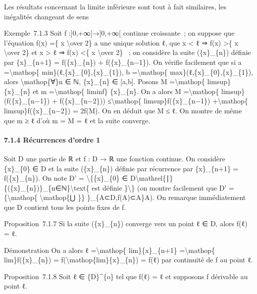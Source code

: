 \documentclass[]{article}
\begin{document}
Les résultats concernant la limite inférieure sont tout à fait
similaires, les inégalités changeant de sens

Exemple~7.1.3 Soit f :{]}0,+∞{[}→{]}0,+∞{[} continue croissante~; on
suppose que l'équation f(x) =\{ x \textbackslash{}over 2\} a une unique
solution ℓ, que x \textless{} ℓ ⇒ f(x) \textgreater{}\{ x
\textbackslash{}over 2\} et x \textgreater{} ℓ ⇒ f(x) \textless{}\{ x
\textbackslash{}over 2\} ~; on considère la suite (\{x\}\_\{n\}) définie
par \{x\}\_\{n+1\} = f(\{x\}\_\{n\}) + f(\{x\}\_\{n−1\}). On vérifie
facilement que si a =\textbackslash{}mathop\{
min\}(ℓ,\{x\}\_\{0\},\{x\}\_\{1\}), b =\textbackslash{}mathop\{
max\}(ℓ,\{x\}\_\{0\},\{x\}\_\{1\}), alors \textbackslash{}mathop\{∀\}n ∈
ℕ, \{x\}\_\{n\} ∈ {[}a,b{]}. Posons M =\textbackslash{}mathop\{
limsup\}\{x\}\_\{n\} et m =\textbackslash{}mathop\{ liminf\}
\{x\}\_\{n\}. On a alors M =\textbackslash{}mathop\{
limsup\}(f(\{x\}\_\{n−1\}) + f(\{x\}\_\{n−2\}))
≤\textbackslash{}mathop\{ limsup\}f(\{x\}\_\{n−1\})
+\textbackslash{}mathop\{ limsup\}f(\{x\}\_\{n−2\}) = 2f(M). On en
déduit que M ≤ ℓ. On montre de même que m ≥ ℓ d'où m = M = ℓ et la suite
converge.

\paragraph{7.1.4 Récurrences d'ordre 1}

Soit D une partie de ℝ et f : D → ℝ une fonction continue. On considère
\{x\}\_\{0\} ∈ D et la suite (\{x\}\_\{n\}) définie par récurrence par
\{x\}\_\{n+1\} = f(\{x\}\_\{n\}). On note D' =
\textbackslash{}\{\{x\}\_\{0\} ∈
D\textbackslash{}mathrel\{∣\}\{(\{x\}\_\{n\})\}\_\{n∈ℕ\}\textbackslash{}text\{
est définie \}\textbackslash{}\} (on montre facilement que D'
=\{\textbackslash{}mathop\{ \textbackslash{}mathop\{⋃ \}\}
\}\_\{A⊂D,f(A)⊂A\}A). On remarque immédiatement que D contient tous les
points fixes de f.

Proposition~7.1.7 Si la suite (\{x\}\_\{n\}) converge vers un point ℓ ∈
D, alors f(ℓ) = ℓ.

Démonstration On a alors ℓ =\textbackslash{}mathop\{ lim\}\{x\}\_\{n+1\}
=\textbackslash{}mathop\{ lim\}f(\{x\}\_\{n\}) =
f(\textbackslash{}mathop\{lim\}\{x\}\_\{n\}) = f(ℓ) par continuité de f
au point ℓ.

Proposition~7.1.8 Soit ℓ ∈ \{D\}\^{}\{o\} tel que f(ℓ) = ℓ et supposons
f dérivable au point ℓ.
\end{document}
